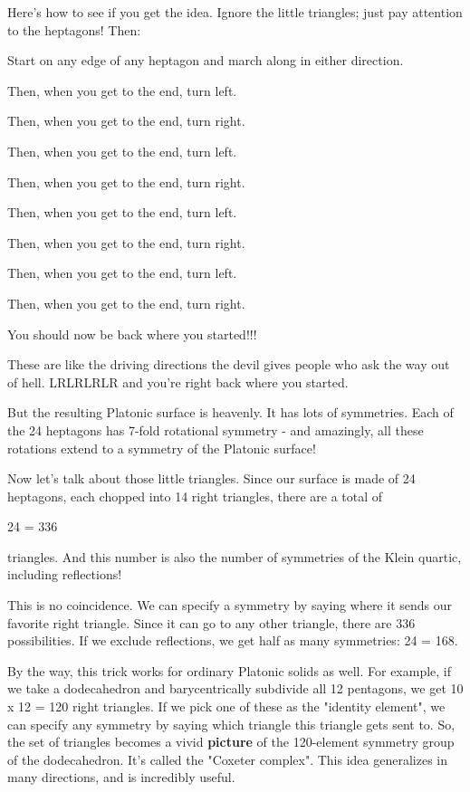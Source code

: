 Here's how to see if you get the idea.   Ignore the little
triangles; just pay attention to the heptagons!   Then:

Start on any edge of any heptagon and march along in either direction. 

Then, when you get to the end, turn left.  

Then, when you get to the end, turn right.  

Then, when you get to the end, turn left.  

Then, when you get to the end, turn right.  

Then, when you get to the end, turn left.  

Then, when you get to the end, turn right.  

Then, when you get to the end, turn left.  

Then, when you get to the end, turn right.  

You should now be back where you started!!!

These are like the driving directions the devil gives people who ask 
the way out of hell.  LRLRLRLR and you're right back where you started.

But the resulting Platonic surface is heavenly.   It has lots of
symmetries.  Each of the 24 heptagons has 7-fold rotational symmetry - 
and amazingly, all these rotations extend to a symmetry of the Platonic 
surface!   

Now let's talk about those little triangles.  Since our surface 
is made of 24 heptagons, each chopped into 14 right triangles, 
there are a total of 

24  = 336

triangles.  And this number is also the number of symmetries of the 
Klein quartic, including reflections!   

This is no coincidence.  We can specify a symmetry by saying where 
it sends our favorite right triangle.  Since it can go to any other
triangle, there are 336 possibilities.  If we exclude reflections,
we get half as many symmetries: 24  = 168.

By the way, this trick works for ordinary Platonic solids as well.  
For example, if we take a dodecahedron and barycentrically subdivide 
all 12 pentagons, we get 10 x 12 = 120 right triangles.    If we pick 
one of these as the "identity element", we can specify any 
symmetry by saying which triangle this triangle gets sent to.  So, the set of 
triangles becomes a vivid \textbf{picture} of the 120-element symmetry group of
 the dodecahedron.  It's called the "Coxeter complex".  This idea 
generalizes in many directions, and is incredibly useful.

